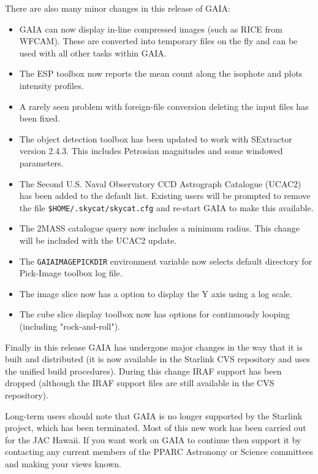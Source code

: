 \documentclass[twoside,11pt]{article}
\renewcommand{\_}{\texttt{\symbol{95}}}
\newcommand{\mytt}[1]{{\texttt{#1}}}
\begin{document}
There are also many minor changes in this release of GAIA:
\begin{itemize}
    \item GAIA can now display in-line compressed images (such as RICE from
     WFCAM). These are converted into temporary files on the fly and can be
     used with all other tasks within GAIA.

    \item The ESP toolbox now reports the mean count along the isophote and
     plots intensity profiles.

    \item A rarely seen problem with foreign-file conversion deleting the
     input files has been fixed.

    \item The object detection toolbox has been updated to work with
     SExtractor version 2.4.3. This includes Petrosian magnitudes and some
     windowed parameters.

    \item The Second U.S. Naval Observatory CCD Astrograph Catalogue (UCAC2)
    has been added to the default list. Existing users will be prompted to
    remove the file \mytt{\$HOME/.skycat/skycat.cfg} and re-start GAIA to make
    this available.

    \item The 2MASS catalogue query now includes a minimum radius. This change
     will be included with the UCAC2 update.

    \item The \mytt{GAIAIMAGEPICK\_DIR} environment variable now selects
     default directory for Pick-Image toolbox log file.

    \item The image slice now has a option to display the Y axis using a log
     scale. 

    \item The cube slice display toolbox now has options for continuously
     looping (including "rock-and-roll").
\end{itemize}

Finally in this release GAIA has undergone major changes in the way that it is
built and distributed (it is now available in the Starlink CVS repository and
uses the unified build procedures). During this change IRAF support has been
dropped (although the IRAF support files are still available in the CVS
repository).

Long-term users should note that GAIA is no longer supported by the Starlink
project, which has been terminated. Most of this new work has been carried out
for the JAC Hawaii. If you want work on GAIA to continue then support it by
contacting any current members of the PPARC Astronomy or Science committees
and making your views known.
\end{document}
